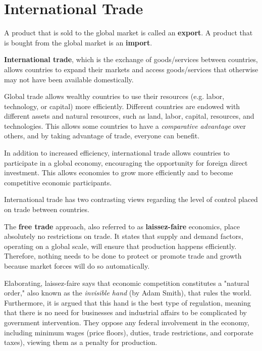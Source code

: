 \documentclass{article}
\begin{document}
\section{International Trade}

  \begin{definition}
    A product that is sold to the global market is called an \textbf{export}. A product that is bought from the global market is an \textbf{import}. 
  \end{definition}

  \begin{definition}
    \textbf{International trade}, which is the exchange of goods/services between countries, allows countries to expand their markets and access goods/services that otherwise may not have been available domestically. 

    Global trade allows wealthy countries to use their resources (e.g. labor, technology, or capital) more efficiently. Different countries are endowed with different assets and natural resources, such as land, labor, capital, resources, and technologies. This allows some countries to have a \textit{comparative advantage} over others, and by taking advantage of trade, everyone can benefit. 

    In addition to increased efficiency, international trade allows countries to participate in a global economy, encouraging the opportunity for foreign direct investment. This allows economies to grow more efficiently and to become competitive economic participants. 
  \end{definition}

  International trade has two contrasting views regarding the level of control placed on trade between countries. 

  \begin{definition}
    The \textbf{free trade} approach, also referred to as \textbf{laissez-faire} economics, place absolutely no restrictions on trade. It states that supply and demand factors, operating on a global scale, will ensure that production happens efficiently. Therefore, nothing needs to be done to protect or promote trade and growth because market forces will do so automatically.

    Elaborating, laissez-faire says that economic competition constitutes a "natural order," also known as the \textit{invisible hand} (by Adam Smith), that rules the world. Furthermore, it is argued that this hand is the best type of regulation, meaning that there is no need for businesses and industrial affairs to be complicated by government intervention. They oppose any federal involvement in the economy, including minimum wages (price floors), duties, trade restrictions, and corporate taxes), viewing them as a penalty for production. 
  \end{definition}
\end{document}
